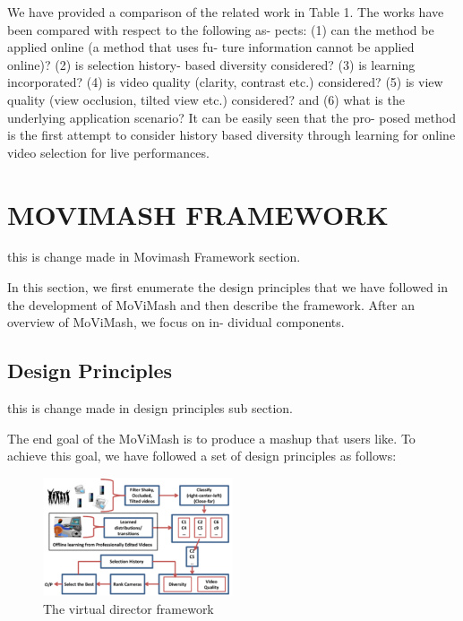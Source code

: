 \documentclass{new}
\begin{document}
We have provided a comparison of the related work in Table 1.
The works have been compared with respect to the following as-
pects: (1) can the method be applied online (a method that uses fu-
ture information cannot be applied online)? (2) is selection history-
based diversity considered? (3) is learning incorporated? (4) is
video quality (clarity, contrast etc.) considered? (5) is view quality
(view occlusion, tilted view etc.) considered? and (6) what is the
underlying application scenario? It can be easily seen that the pro-
posed method is the first attempt to consider history based diversity
through learning for online video selection for live performances.

\section{MOVIMASH FRAMEWORK}
this is change made in Movimash Framework section.

In this section, we first enumerate the design principles that we
have followed in the development of MoViMash and then describe
the framework. After an overview of MoViMash, we focus on in-
dividual components.



\subsection{Design Principles}
this is change made in design principles sub section.

The end goal of the MoViMash is to produce a mashup that users
like. To achieve this goal, we have followed a set of design principles as follows:

\begin{figure}
    \centering
    \includegraphics[width=0.5\textwidth]{img2.png}
    \caption{The virtual director framework}
    \label{fig:2}
\end{figure}
\end{document}
